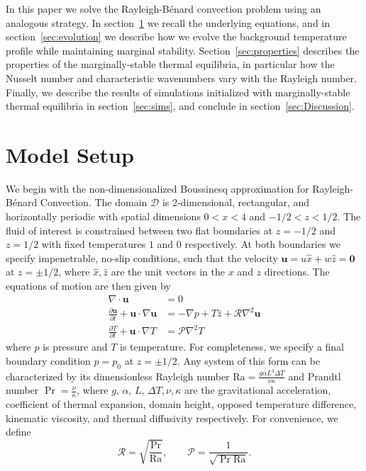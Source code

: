 \documentclass[reprint,amsmath,amssymb,aps]{revtex4-1}
\newcommand\Ra{\mathrm{Ra}}
\begin{document}
In this paper we solve the Rayleigh-B\'{e}nard convection problem using an analogous strategy.
In section~\ref{sec:model} we recall the underlying equations, and in section~\ref{sec:evolution} we describe how we evolve the background temperature profile while maintaining marginal stability.
Section~\ref{sec:properties} describes the properties of the marginally-stable thermal equilibria, in particular how the Nusselt number and characteristic wavenumbers vary with the Rayleigh number.
Finally, we describe the results of simulations initialized with marginally-stable thermal equilibria in section~\ref{sec:sims}, and conclude in section~\ref{sec:Discussion}.
 
\section{Model Setup}\label{sec:model}
We begin with the non-dimensionalized Boussinesq approximation for Rayleigh-Bénard Convection. 
The domain $\mathcal{D}$ is 2-dimensional, rectangular, and horizontally periodic with spatial dimensions $0 < x < 4$ and $-1/2 < z < 1/2$. 
The fluid of interest is constrained between two flat boundaries at $z = -1/2$ and $z = 1/2$ with fixed temperatures $1$ and $0$ respectively. 
At both boundaries we specify impenetrable, no-slip conditions, such that the velocity $\mathbf{u} = u \hat{x} + w \hat{z} = \mathbf{0}$ at $z = \pm 1/2$, where $\hat{x}, \hat{z}$ are the unit vectors in the $x$ and $z$ directions. 
The equations of motion are then given by
\begin{align}
    \nabla \cdot \mathbf{u} &= 0 \label{EQ:motion1}\\
    \frac{\partial \mathbf{u}}{\partial t} + \mathbf{u} \cdot \nabla \mathbf{u} &= - \nabla p + T \hat{z} + \mathcal{R} \nabla^2 \mathbf{u} \label{EQ:motion2}\\
    \frac{\partial T}{\partial t} + \mathbf{u} \cdot \nabla T &= \mathcal{P} \nabla^2 T \label{EQ:motion3}
\end{align}
where $p$ is pressure and $T$ is temperature. 
For completeness, we specify a final boundary condition $p = p_0$ at $z = \pm 1/2$. 
Any system of this form can be characterized by its dimensionless Rayleigh number $\Ra = \frac{g\alpha L^3 \Delta T}{\nu \kappa}$ and Prandtl number $\Pr = \frac{\nu}{\kappa}$, where $g, \, \alpha, \, L, \, \Delta T, \nu, \kappa$ are the gravitational acceleration, coefficient of thermal expansion, domain height, opposed temperature difference, kinematic viscosity, and thermal diffusivity respectively. For convenience, we define
\begin{equation}
\mathcal{R} = \sqrt{\frac{\Pr}{\Ra}}, \qquad \mathcal{P} = \frac{1}{\sqrt{\Pr \Ra}}.
\end{equation}
\end{document}
